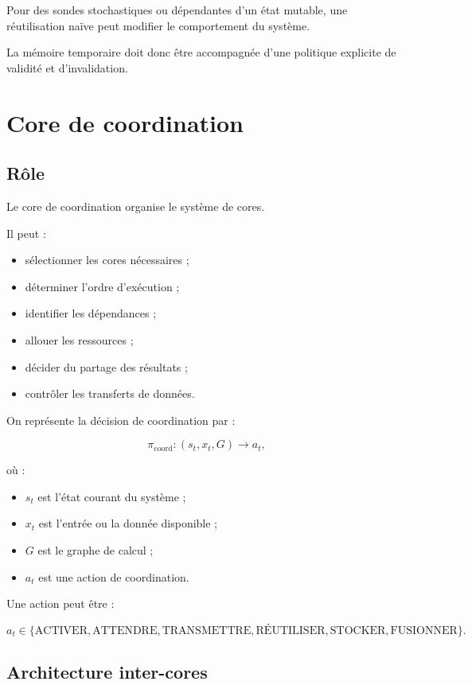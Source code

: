 \documentclass[11pt,a4paper]{article}
\begin{document}
Pour des sondes stochastiques ou dépendantes d'un état mutable,
une réutilisation naïve peut modifier le comportement du système.

La mémoire temporaire doit donc être accompagnée d'une politique
explicite de validité et d'invalidation.

\section{Core de coordination}

\subsection{Rôle}

Le core de coordination organise le système de cores.

Il peut :
\begin{itemize}
  \item sélectionner les cores nécessaires ;
  \item déterminer l'ordre d'exécution ;
  \item identifier les dépendances ;
  \item allouer les ressources ;
  \item décider du partage des résultats ;
  \item contrôler les transferts de données.
\end{itemize}

On représente la décision de coordination par :

\[
\pi_{\mathrm{coord}}:
(s_t,x_t,G)
\rightarrow
a_t,
\]

où :
\begin{itemize}
  \item $s_t$ est l'état courant du système ;
  \item $x_t$ est l'entrée ou la donnée disponible ;
  \item $G$ est le graphe de calcul ;
  \item $a_t$ est une action de coordination.
\end{itemize}

Une action peut être :

\[
a_t\in
\{
\text{ACTIVER},
\text{ATTENDRE},
\text{TRANSMETTRE},
\text{RÉUTILISER},
\text{STOCKER},
\text{FUSIONNER}
\}.
\]

\subsection{Architecture inter-cores}
\end{document}
